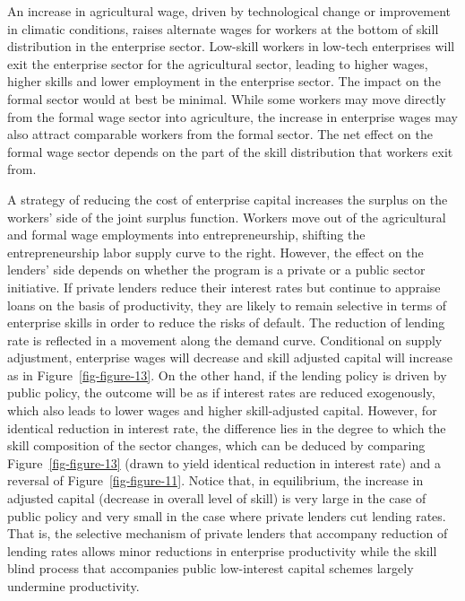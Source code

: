 \documentclass[
  a4paper,
  DIV=11,
  numbers=noendperiod]{scrartcl}
\begin{document}
An increase in agricultural wage, driven by technological change or
improvement in climatic conditions, raises alternate wages for workers
at the bottom of skill distribution in the enterprise sector. Low-skill
workers in low-tech enterprises will exit the enterprise sector for the
agricultural sector, leading to higher wages, higher skills and lower
employment in the enterprise sector. The impact on the formal sector
would at best be minimal. While some workers may move directly from the
formal wage sector into agriculture, the increase in enterprise wages
may also attract comparable workers from the formal sector. The net
effect on the formal wage sector depends on the part of the skill
distribution that workers exit from.

A strategy of reducing the cost of enterprise capital increases the
surplus on the workers' side of the joint surplus function. Workers move
out of the agricultural and formal wage employments into
entrepreneurship, shifting the entrepreneurship labor supply curve to
the right. However, the effect on the lenders' side depends on whether
the program is a private or a public sector initiative. If private
lenders reduce their interest rates but continue to appraise loans on
the basis of productivity, they are likely to remain selective in terms
of enterprise skills in order to reduce the risks of default. The
reduction of lending rate is reflected in a movement along the demand
curve. Conditional on supply adjustment, enterprise wages will decrease
and skill adjusted capital will increase as in
Figure~\ref{fig-figure-13}. On the other hand, if the lending policy is
driven by public policy, the outcome will be as if interest rates are
reduced exogenously, which also leads to lower wages and higher
skill-adjusted capital. However, for identical reduction in interest
rate, the difference lies in the degree to which the skill composition
of the sector changes, which can be deduced by comparing
Figure~\ref{fig-figure-13} (drawn to yield identical reduction in
interest rate) and a reversal of Figure~\ref{fig-figure-11}. Notice
that, in equilibrium, the increase in adjusted capital (decrease in
overall level of skill) is very large in the case of public policy and
very small in the case where private lenders cut lending rates. That is,
the selective mechanism of private lenders that accompany reduction of
lending rates allows minor reductions in enterprise productivity while
the skill blind process that accompanies public low-interest capital
schemes largely undermine productivity.
\end{document}
